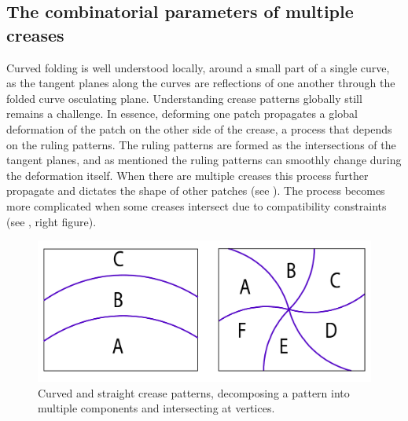 

\subsection{The combinatorial parameters of multiple creases}
Curved folding is well understood locally, around a small part of a single curve, as the tangent planes along the curves are reflections of one another through the folded curve osculating plane. Understanding crease patterns globally still remains a challenge. In essence, deforming one patch propagates a global deformation of the patch on the other side of the crease, a process that depends on the ruling patterns. The ruling patterns are formed as the intersections of the tangent planes, and as mentioned the ruling patterns can smoothly change during the deformation itself. When there are multiple creases this process further propagate and dictates the shape of other patches (see ). The process becomes more complicated when some creases intersect due to compatibility constraints (see , right figure). 

\begin{figure} [h]
	\centering
	\includegraphics[width=0.7\linewidth]{figures/multiple_crease_patterns}
	\caption{Curved and straight crease patterns, decomposing a pattern into multiple components and intersecting at vertices.}
	\label{fig:multiple_crease_pattern}
\end{figure}

